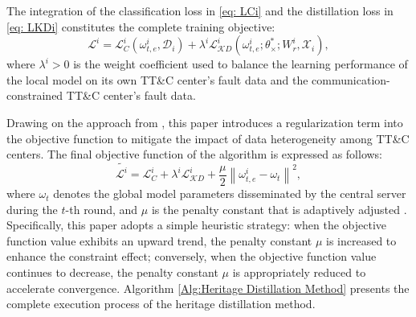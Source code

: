 The integration of the classification loss in \eqref{eq: LCi} and the distillation loss in \eqref{eq: LKDi} constitutes the complete training objective:
\begin{equation}
	{\mathcal L^i} = \mathcal L_C^i\left( {\omega _{t,e}^i,{{\mathscr D}_i}} \right) + {\lambda ^i}\mathcal L_{\mathcal KD}^i\left( {\omega _{t,e}^i;\theta _ \times ^ * ;W_r^i,{\mathcal X_i}} \right),
\end{equation}
where $\lambda^i > 0$ is the weight coefficient 
used to balance the learning performance of the local model on its own TT\&C center's fault data 
and the communication-constrained TT\&C center's fault data.

Drawing on the approach from \cite{li2020federated}, this paper introduces a regularization term into the objective function 
to mitigate the impact of data heterogeneity among TT\&C centers. The final objective function of the algorithm is expressed as follows:
\begin{equation}
	{{\tilde {\mathcal  L^i}}} = \mathcal L_C^i + {\lambda ^i}\mathcal L_{\mathcal KD}^i + \frac{\mu }{2}{\left\| {\omega _{t,e}^i - {\omega _t}} \right\|^2},
\end{equation}
where ${\omega _t}$ denotes the global model parameters disseminated by the central server during the $t$-th round, 
and $\mu$ is the penalty constant that is adaptively adjusted \cite{li2020federated}. 
Specifically, this paper adopts a simple heuristic strategy: 
when the objective function value exhibits an upward trend, the penalty constant $\mu$ is increased to enhance the constraint effect; 
conversely, when the objective function value continues to decrease, 
the penalty constant $\mu$ is appropriately reduced to accelerate convergence. 
Algorithm \ref{Alg:Heritage Distillation Method} presents the complete execution process of the heritage distillation method.

